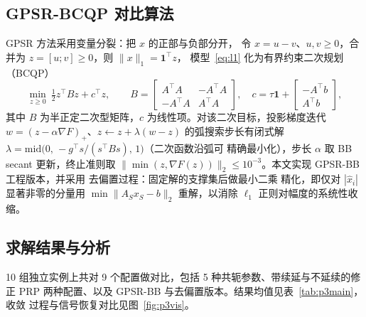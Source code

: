 \documentclass[withoutpreface,bwprint]{cumcmthesis}
\begin{document}
\subsection{GPSR-BCQP 对比算法}

GPSR 方法\cite{figueiredo2008}采用变量分裂：把 $x$ 的正部与负部分开，
令 $x=u-v$、$u,v\ge0$，合并为 $z=[u;v]\ge0$，则 $\|x\|_1=\mathbf{1}^{\top}z$，
模型~\eqref{eq:l1} 化为有界约束二次规划（BCQP）
\begin{equation}
  \min_{z\ge0}\ \tfrac12 z^{\top}Bz+c^{\top}z,\qquad
  B=\begin{bmatrix}A^{\top}A&-A^{\top}A\\-A^{\top}A&A^{\top}A\end{bmatrix},\quad
  c=\tau\mathbf{1}+\begin{bmatrix}-A^{\top}b\\ A^{\top}b\end{bmatrix},
\end{equation}
其中 $B$ 为半正定二次型矩阵，$c$ 为线性项。对该二次目标，投影梯度迭代
$w=(z-\alpha\nabla F)_+$、$z\leftarrow z+\lambda(w-z)$ 的弧搜索步长有闭式解
$\lambda=\mathrm{mid}\big(0,\,-g^{\top}s/(s^{\top}Bs),\,1\big)$（二次函数沿弧可
精确最小化），步长 $\alpha$ 取 BB secant 更新，终止准则取
$\|\min(z,\nabla F(z))\|_2\le10^{-3}$。本文实现 GPSR-BB 工程版本，并采用
去偏置过程\cite{figueiredo2008}：固定解的支撑集后做最小二乘
精化，即仅对 $|\hat x_i|$ 显著非零的分量用 $\min\|A_Sx_S-b\|_2$ 重解，以消除
$\ell_1$ 正则对幅度的系统性收缩。

\subsection{求解结果与分析}

10 组独立实例上共对 9 个配置做对比，包括 5 种共轭参数、带续延与不延续的修正
PRP 两种配置、以及 GPSR-BB 与去偏置版本。结果均值见表~\ref{tab:p3main}，收敛
过程与信号恢复对比见图~\ref{fig:p3vis}。
\end{document}
